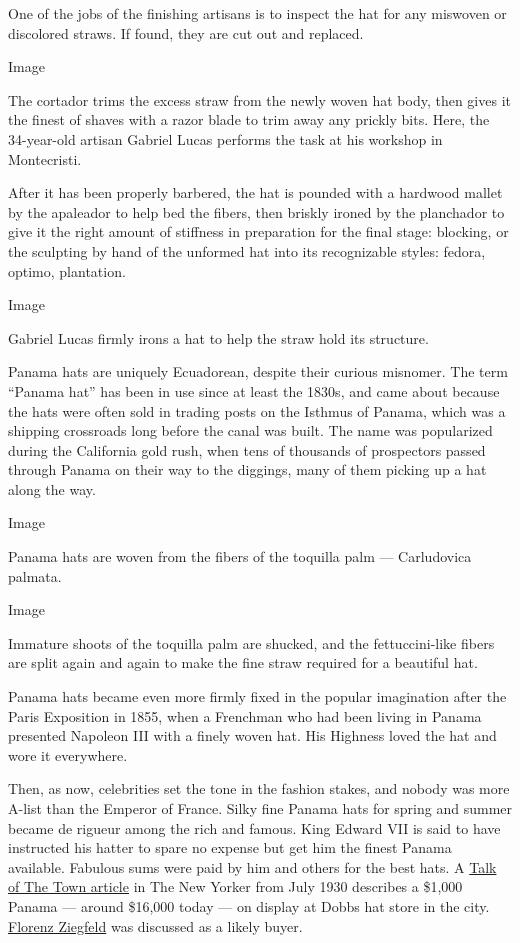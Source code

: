 One of the jobs of the finishing artisans is to inspect the hat for any
miswoven or discolored straws. If found, they are cut out and replaced.

Image

The cortador trims the excess straw from the newly woven hat body, then
gives it the finest of shaves with a razor blade to trim away any
prickly bits. Here, the 34-year-old artisan Gabriel Lucas performs the
task at his workshop in Montecristi.

After it has been properly barbered, the hat is pounded with a hardwood
mallet by the apaleador to help bed the fibers, then briskly ironed by
the planchador to give it the right amount of stiffness in preparation
for the final stage: blocking, or the sculpting by hand of the unformed
hat into its recognizable styles: fedora, optimo, plantation.

Image

Gabriel Lucas firmly irons a hat to help the straw hold its structure.

Panama hats are uniquely Ecuadorean, despite their curious misnomer. The
term ``Panama hat'' has been in use since at least the 1830s, and came
about because the hats were often sold in trading posts on the Isthmus
of Panama, which was a shipping crossroads long before the canal was
built. The name was popularized during the California gold rush, when
tens of thousands of prospectors passed through Panama on their way to
the diggings, many of them picking up a hat along the way.

Image

Panama hats are woven from the fibers of the toquilla palm ---
Carludovica palmata.

Image

Immature shoots of the toquilla palm are shucked, and the
fettuccini-like fibers are split again and again to make the fine straw
required for a beautiful hat.

Panama hats became even more firmly fixed in the popular imagination
after the Paris Exposition in 1855, when a Frenchman who had been living
in Panama presented Napoleon III with a finely woven hat. His Highness
loved the hat and wore it everywhere.

Then, as now, celebrities set the tone in the fashion stakes, and nobody
was more A-list than the Emperor of France. Silky fine Panama hats for
spring and summer became de rigueur among the rich and famous. King
Edward VII is said to have instructed his hatter to spare no expense but
get him the finest Panama available. Fabulous sums were paid by him and
others for the best hats. A
\href{https://www.newyorker.com/magazine/1930/07/05/thousand-dollar-hats}{Talk
of The Town article} in The New Yorker from July 1930 describes a
\$1,000 Panama --- around \$16,000 today --- on display at Dobbs hat
store in the city.
\href{https://www.pbs.org/wnet/broadway/stars/florenz-ziegfeld/}{Florenz
Ziegfeld} was discussed as a likely buyer.

